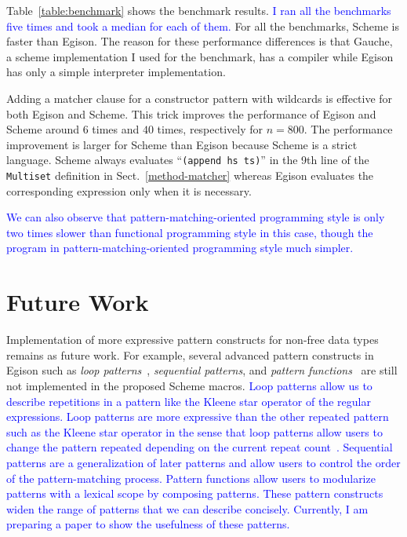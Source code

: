 \documentclass[acmlarge]{acmart}
\newcommand{\new}[1]{\textcolor{blue}{#1}}
\begin{document}
Table~\ref{table:benchmark} shows the benchmark results.
\new{
I ran all the benchmarks five times and took a median for each of them.
}%
For all the benchmarks, Scheme is faster than Egison.
The reason for these performance differences is that Gauche, a scheme implementation I used for the benchmark, has a compiler while Egison has only a simple interpreter implementation.

Adding a matcher clause for a constructor pattern with wildcards is effective for both Egison and Scheme.
This trick improves the performance of Egison and Scheme around $6$ times and $40$ times, respectively for $n=800$.
The performance improvement is larger for Scheme than Egison because Scheme is a strict language.
Scheme always evaluates ``\lstinline{(append hs ts)}'' in the 9th line of the \lstinline{Multiset} definition in Sect.~\ref{method-matcher} whereas Egison evaluates the corresponding expression only when it is necessary.

\new{
We can also observe that pattern-matching-oriented programming style is only two times slower than functional programming style in this case, though the program in pattern-matching-oriented programming style much simpler.
}%

\section{Future Work}\label{future}

Implementation of more expressive pattern constructs for non-free data types remains as future work.
For example, several advanced pattern constructs in Egison such as \emph{loop patterns}~\cite{egi2018loop}, \emph{sequential patterns}, and \emph{pattern functions}~\cite{egisonPat} are still not implemented in the proposed Scheme macros.
\new{
Loop patterns allow us to describe repetitions in a pattern like the Kleene star operator of the regular expressions.
Loop patterns are more expressive than the other repeated pattern such as the Kleene star operator in the sense that loop patterns allow users to change the pattern repeated depending on the current repeat count~\cite{egi2018loop}.
Sequential patterns are a generalization of later patterns and allow users to control the order of the pattern-matching process.
Pattern functions allow users to modularize patterns with a lexical scope by composing patterns.
These pattern constructs widen the range of patterns that we can describe concisely.
Currently, I am preparing a paper to show the usefulness of these patterns.
}%
\end{document}
